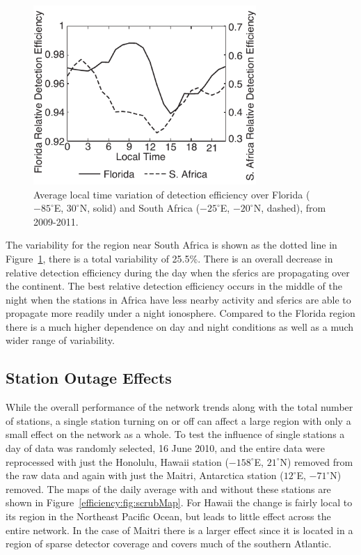 \begin{figure}[ht!]
   \centering
\noindent\includegraphics[width=20pc]{efficiency/Figures/2012RS005049-f11.pdf}
   \caption{Average local time variation of detection efficiency over Florida ($-85^\circ$E, $30^\circ$N, solid) and South Africa ($-25^\circ$E, $-20^\circ$N, dashed), from 2009-2011.}
   \label{efficiency:fig:deUTC}
\end{figure}

The variability for the region near South Africa is shown as the dotted line in Figure~\ref{efficiency:fig:deUTC}, there is a total variability of 25.5\%.
There is an overall decrease in relative detection efficiency during the day when the sferics are propagating over the continent.
The best relative detection efficiency occurs in the middle of the night when the stations in Africa have less nearby activity and sferics are able to propagate more readily under a night ionosphere.
Compared to the Florida region there is a much higher dependence on day and night conditions as well as a much wider range of variability.

\subsection{Station Outage Effects}

While the overall performance of the network trends along with the total number of stations, a single station turning on or off can affect a large region with only a small effect on the network as a whole.
To test the influence of single stations a day of data was randomly selected, 16 June 2010, and the entire data were reprocessed with just the Honolulu, Hawaii station ($-158^\circ$E, $21^\circ$N) removed from the raw data and again with just the Maitri, Antarctica station ($12^\circ$E, $-71^\circ$N) removed.
The maps of the daily average with and without these stations are shown in Figure~\ref{efficiency:fig:scrubMap}.
For Hawaii the change is fairly local to its region in the Northeast Pacific Ocean, but leads to little effect across the entire network.
In the case of Maitri there is a larger effect since it is located in a region of sparse detector coverage and covers much of the southern Atlantic.

